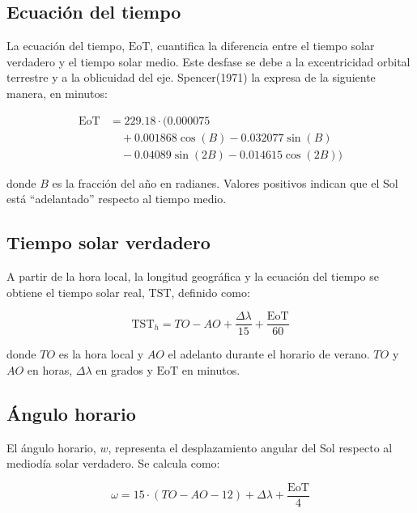\subsection{Ecuación del tiempo}

La ecuación del tiempo, $\mathrm{EoT}$, cuantifica la diferencia entre el tiempo solar verdadero y el 
tiempo solar medio. Este desfase se debe a la excentricidad orbital terrestre y a la oblicuidad del eje. Spencer(1971) la expresa de la siguiente manera, en minutos:


\begin{equation}
	\begin{split}
		\mathrm{EoT} &= 229.18\cdot(0.000075 \\
		&\quad + 0.001868\cos(B) - 0.032077\sin(B) \\
		&\quad - 0.04089\sin(2B) - 0.014615\cos (2B))
	\end{split}
\end{equation}

donde $B$ es la fracción del año en radianes. Valores positivos indican que el Sol está “adelantado” respecto al tiempo medio.

\subsection{Tiempo solar verdadero}

A partir de la hora local, la longitud geográfica y la ecuación del tiempo se obtiene el tiempo solar real, $\mathrm{TST}$, definido como:

\begin{equation}
    \mathrm{TST}_h = TO - AO + \frac{\Delta \lambda}{15} + \frac{\mathrm{EoT}}{60}
\end{equation}

donde $TO$ es la hora local y $AO$ el adelanto durante el horario de verano. $TO$ y $AO$ en horas, $\Delta \lambda$ en grados y $\mathrm{EoT}$ en minutos.

\subsection{Ángulo horario}

El ángulo horario, $w$, representa el desplazamiento angular del Sol respecto al mediodía solar verdadero. Se calcula como:

\begin{equation}
    \omega = 15 \cdot(TO - AO - 12) + \Delta \lambda + \frac{\mathrm{EoT}}{4}
\end{equation}

